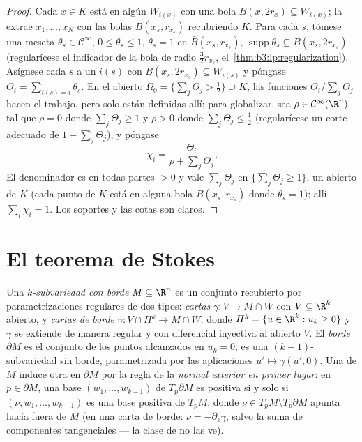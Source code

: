 \begin{proof}
Cada $x \in K$ está en algún $W_{i(x)}$ con una bola
$\bar B(x, 2r_x) \subseteq W_{i(x)}$; la  extrae
$x_1, \dots, x_N$ con las bolas $B(x_s, r_{x_s})$ recubriendo $K$. Para
cada $s$, tómese una meseta $\theta_s \in \mathcal
C^\infty$, $0 \leq \theta_s \leq 1$, $\theta_s = 1$ en
$\bar B(x_s, r_{x_s})$, $\operatorname{supp}\theta_s
\subseteq B(x_s, 2r_{x_s})$ (regularícese el indicador de la bola de
radio $\frac32r_{x_s}$, el~\cref{thm:b3:lp:regularization}). Asígnese
cada $s$ a un  $i(s)$ con $B(x_s, 2r_{x_s}) \subseteq W_{i(s)}$ y
póngase $\Theta_i = \sum_{i(s) = i}\theta_s$. En el
abierto
$\Omega_0 = \{\sum_j\Theta_j > \tfrac12\} \supseteq K$, las funciones
$\Theta_i/\sum_j\Theta_j$ hacen el trabajo, pero solo están definidas
allí; para globalizar, sea $\rho \in \mathcal
C^\infty(\R^n)$ tal que $\rho = 0$ donde $\sum_j\Theta_j
\geq 1$ y $\rho > 0$ donde $\sum_j\Theta_j \leq \tfrac12$ (regularícese
un corte adecuado de $1 - \sum_j\Theta_j$), y póngase
\[
\chi_i = \frac{\Theta_i}{\rho + \sum_j\Theta_j} .
\]
El denominador es en todas partes $> 0$ y vale $\sum_j\Theta_j$ en
$\{\sum_j\Theta_j \geq 1\}$, un
 abierto de $K$ (cada punto de
$K$ está en alguna bola $B(x_s, r_{x_s})$ donde $\theta_s = 1$); allí
$\sum_i\chi_i = 1$. Los soportes y las cotas son claros.
\end{proof}

\section{El teorema de Stokes}

\begin{definition}\label{def:b3:forms:boundary}
Una \emph{$k$-subvariedad con borde}
$M \subseteq \R^n$ es un conjunto recubierto por parametrizaciones
regulares de dos tipos: \emph{cartas
}
$\gamma\colon V \to M \cap W$ con $V \subseteq \R^k$ abierto, y
\emph{cartas de borde} $\gamma\colon V \cap H^k \to M
\cap W$, donde $H^k = \{u \in \R^k : u_k \geq 0\}$ y $\gamma$ se
extiende de manera regular y con diferencial inyectiva al abierto $V$.
El \emph{borde} $\partial M$ es el conjunto de los puntos alcanzados en
$u_k = 0$; es una $(k-1)$-subvariedad sin borde, parametrizada por las
aplicaciones $u' \mapsto \gamma(u',
0)$. Una  de $M$ induce
otra en $\partial M$ por la regla de la \emph{normal exterior en primer
lugar}: en $p \in \partial M$, una base $(w_1, \dots, w_{k-1})$ de
$T_p\partial M$ es positiva si y solo si $(\nu, w_1, \dots, w_{k-1})$ es
una base positiva de $T_pM$, donde
$\nu \in T_pM \setminus T_p\partial M$ apunta hacia fuera de $M$ (en una
carta de borde: $\nu =
-\partial_k\gamma$, salvo la suma de componentes tangenciales --- la
clase de  no las ve).
\end{definition}


